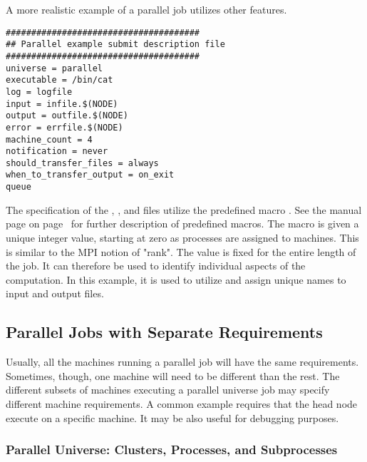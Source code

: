 A more realistic example of a parallel job utilizes other features.

\begin{verbatim}
######################################
## Parallel example submit description file
######################################
universe = parallel
executable = /bin/cat
log = logfile
input = infile.$(NODE)
output = outfile.$(NODE)
error = errfile.$(NODE)
machine_count = 4
notification = never
should_transfer_files = always
when_to_transfer_output = on_exit
queue
\end{verbatim}

The specification of the , ,
and  files utilize the predefined macro 
.
See the 
manual page on page~\pageref{man-condor-submit} for further
description of predefined macros.
The  macro is given a
unique integer value, starting at zero as processes are assigned to machines.
This is similar to the MPI notion of "rank".
The  value is fixed for the entire length of the job.
It can therefore be used to identify individual aspects of the computation.
In this example, it is used to utilize and assign unique names to
input and output files.

\subsection{\label{sec:parallel-multi-proc}Parallel Jobs with Separate Requirements}

Usually, all the machines running a parallel job will have the
same requirements.  Sometimes, though, one machine will need
to be different than the rest.  
The different subsets of machines executing a parallel universe job
may specify different machine requirements.  A common example requires that the
head node execute on a specific machine.  It may be also useful for debugging purposes.


\subsubsection{\label{sec:Configure-Clusters-Processes-Subprocesses}
Parallel Universe: Clusters, Processes, and Subprocesses} 

